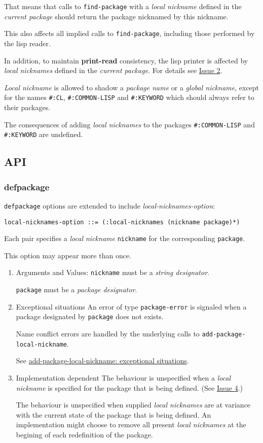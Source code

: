 \documentclass[11pt]{article}
\begin{document}
That means that calls to \texttt{find-package} with a \emph{local nickname} defined in the
\emph{current package} should return the package nicknamed by this nickname.

This also affects all implied calls to \texttt{find-package}, including those performed by
the lisp reader.

In addition, to maintain \textbf{print-read} consistency, the lisp printer is affected by
\emph{local nicknames} defined in the \emph{current package}.
For details see \hyperref[sec:org335fb35]{Issue 2}.

\emph{Local nickname} is allowed to shadow a \emph{package name} or a \emph{global nickname},
except for the names \texttt{\#:CL}, \texttt{\#:COMMON-LISP} and \texttt{\#:KEYWORD} which should always
refer to their packages.

The consequences of adding \emph{local nicknames} to the packages \texttt{\#:COMMON-LISP} and
\texttt{\#:KEYWORD} are undefined.
\subsection{API}
\label{sec:org6aa01c8}
\subsubsection{defpackage}
\label{sec:org2302211}
\texttt{defpackage} options are extended to include \emph{local-nicknames-option}:
\begin{verbatim}
local-nicknames-option ::= (:local-nicknames (nickname package)*)
\end{verbatim}


Each pair specifies a \emph{local nickname} \texttt{nickname} for the corresponding \texttt{package}.

This option may appear more than once.
\begin{enumerate}
\item Arguments and Values:
\label{sec:org92ba772}
\texttt{nickname} must be a \emph{string designator}.

\texttt{package} must be a \emph{package designator}.
\item Exceptional situations
\label{sec:orgd90db0b}
An error of type \texttt{package-error} is signaled when a package designated by
\texttt{package} does not exists.

Name conflict errors are handled by the underlying calls to
\texttt{add-package-local-nickname}.

See \hyperref[sec:org07f12c7]{add-package-local-nickname: exceptional situations}.
\item Implementation dependent
\label{sec:org4ca0aac}
The behaviour is unspecified when a \emph{local nickname} is specified for the package
that is being defined. (See \hyperref[sec:orga574aea]{Issue 4}.)

The behaviour is unspecified when supplied \emph{local nicknames} are at variance with
the current state of the package that is being defined. An implementation might
choose to remove all present \emph{local nicknames} at the begining of each
redefinition of the package.
\end{enumerate}
\end{document}
